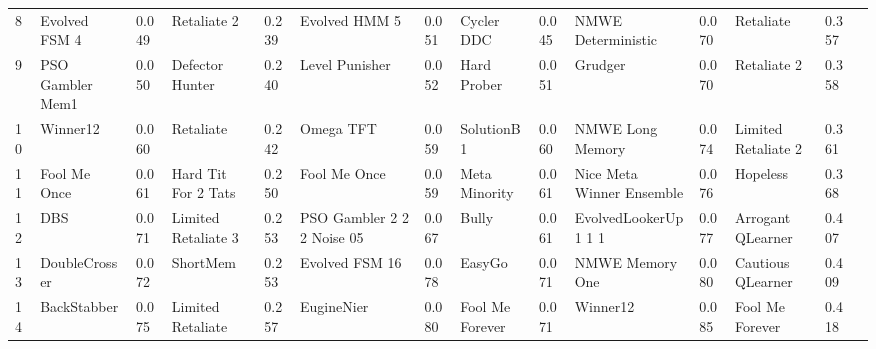 \begin{tabular}{lggllggllggllr}
8  &            Evolved FSM 4 &     0.049 &            Retaliate 2 &     0.239 &               Evolved HMM 5 &     0.051 &         Cycler DDC &     0.045 &         NMWE Deterministic &     0.070 &            Retaliate &     0.357 \\
9  &         PSO Gambler Mem1 &     0.050 &        Defector Hunter &     0.240 &              Level Punisher &     0.052 &        Hard Prober &     0.051 &                    Grudger &     0.070 &          Retaliate 2 &     0.358 \\
10 &                 Winner12 &     0.060 &              Retaliate &     0.242 &                   Omega TFT &     0.059 &         SolutionB1 &     0.060 &           NMWE Long Memory &     0.074 &  Limited Retaliate 2 &     0.361 \\
11 &             Fool Me Once &     0.061 &    Hard Tit For 2 Tats &     0.250 &                Fool Me Once &     0.059 &      Meta Minority &     0.061 &  Nice Meta Winner Ensemble &     0.076 &             Hopeless &     0.368 \\
12 &                      DBS &     0.071 &    Limited Retaliate 3 &     0.253 &  PSO Gambler 2 2 2 Noise 05 &     0.067 &              Bully &     0.061 &       EvolvedLookerUp1 1 1 &     0.077 &    Arrogant QLearner &     0.407 \\
13 &            DoubleCrosser &     0.072 &               ShortMem &     0.253 &              Evolved FSM 16 &     0.078 &             EasyGo &     0.071 &            NMWE Memory One &     0.080 &    Cautious QLearner &     0.409 \\
14 &              BackStabber &     0.075 &      Limited Retaliate &     0.257 &                  EugineNier &     0.080 &    Fool Me Forever &     0.071 &                   Winner12 &     0.085 &      Fool Me Forever &     0.418 \\
\bottomrule
    \end{tabular}
    